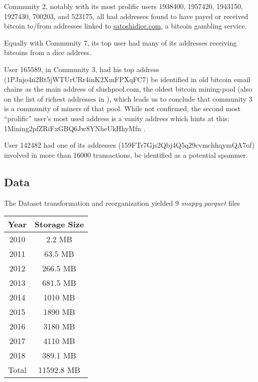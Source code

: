 \documentclass{article}
\begin{document}
Community 2, notably with its most prolific users 1938400, 1957420, 1943150, 1927430, 
700203, and 523175, all had addresses found to have payed or received bitcoin to/from 
addresses linked to \url{satoshidice.com}, a bitcoin gambling service.

Equally with Community 7, its top user had many of its addresses receiving bitcoins from a dice address.

User 165589, in Community 3, had his top address (1PJnjo4n2Rt5jWTUrCRr4inK2XmFPXqFC7) be
identified in old bitcoin email chains \cite{email chain} as the main address of slushpool.com,
the oldest bitcoin mining-pool (also on the list of richest addresses in \cite{rich}),
which leads us to conclude that community 3 is a community of miners of that pool. 
While not confirmed, the second most ``prolific'' user's most used address is a vanity 
address which hints at this: 1Mining2pfZRiFxGBQ6Jw8YNheUkHhyMfn .

User 142482 had one of its addresses (159FTr7Gjs2Qbj4Q5q29cvmchhqymQA7of) involved in more 
than 16000 transactions, be identified as a potential spammer\cite{petri}.

\pagebreak
\subsection{Data}

The Dataset transformation and reorganization yielded 9 \textit{snappy.parquet} files

\bigskip

\begin{tabular}{|c|c|}
\hline
Year & Storage Size \\
\hline
\hline
 2010 & 2.2 MB \\
\hline
 2011 & 63.5 MB \\
\hline
 2012 & 266.5 MB \\
 \hline
 2013 & 681.5 MB \\
 \hline
 2014 & 1010 MB \\
 \hline
 2015 & 1890 MB \\
 \hline
 2016 & 3180 MB \\
 \hline
 2017 & 4110 MB \\
 \hline
 2018 & 389.1 MB \\
\hline
 Total & 11592.8 MB \\
 \hline

\end{tabular}

\bigskip
\end{document}
